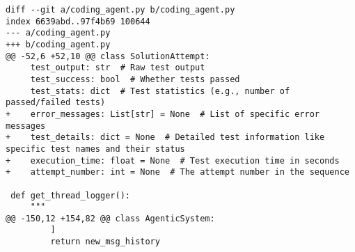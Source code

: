 \begin{lstlisting}[style=diffstyle]
diff --git a/coding_agent.py b/coding_agent.py
index 6639abd..97f4b69 100644
--- a/coding_agent.py
+++ b/coding_agent.py
@@ -52,6 +52,10 @@ class SolutionAttempt:
     test_output: str  # Raw test output
     test_success: bool  # Whether tests passed
     test_stats: dict  # Test statistics (e.g., number of passed/failed tests)
+    error_messages: List[str] = None  # List of specific error messages
+    test_details: dict = None  # Detailed test information like specific test names and their status
+    execution_time: float = None  # Test execution time in seconds
+    attempt_number: int = None  # The attempt number in the sequence
 
 def get_thread_logger():
     """
@@ -150,12 +154,82 @@ class AgenticSystem:
         ]
         return new_msg_history
 

\end{lstlisting}
